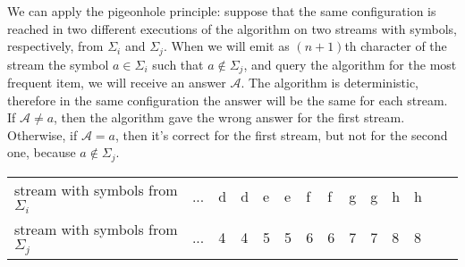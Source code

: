 We can apply the pigeonhole principle: suppose that the same configuration is reached in two different executions of the algorithm on two streams with symbols, respectively, from $\Sigma_i$ and $\Sigma_j$. When we will emit as $(n+1)$th character of the stream the symbol $a \in \Sigma_i$ such that $a \notin \Sigma_j$, and query the algorithm for the most frequent item, we will receive an answer $\mathcal{A}$. The algorithm is deterministic, therefore in the same configuration the answer will be the same for each stream. If $\mathcal{A} \neq a$, then the algorithm gave the wrong answer for the first stream. Otherwise, if $\mathcal{A} = a$, then it's correct for the first stream, but not for the second one, because $a \notin \Sigma_j$.

\begin{table}[h]
  \centering
  \begin{tabular}{l|l|l|l|l|l|l|l|l|l|l|l|l|l|}
    \cline{2-12}
    stream with symbols from $\Sigma_i$ & ... & d & d & e & e & f & f & g & g & h & h \\ \cline{2-12} 
    stream with symbols from $\Sigma_j$ & ... & 4 & 4 & 5 & 5 & 6 & 6 & 7 & 7 & 8 & 8 \\ \cline{2-12} 
  \end{tabular}
\end{table}
